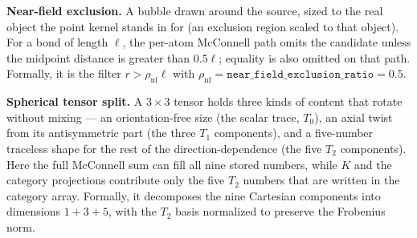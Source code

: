 \documentclass[11pt]{article}
\newcommand{\code}[1]{\texttt{#1}}
\begin{document}
\textbf{Near-field exclusion.} A bubble drawn around the source, sized to the
real object the point kernel stands in for (an exclusion region scaled to that
object). For a
bond of length \(\ell\), the per-atom McConnell path omits the candidate unless
the midpoint distance is greater than \(0.5\ell\); equality is also omitted on
that path. Formally, it is the filter \(r>\rho_{\mathrm{nf}}\ell\) with
\(\rho_{\mathrm{nf}}=\code{near\_field\_exclusion\_ratio}=0.5\).

\textbf{Spherical tensor split.} A \(3\times3\) tensor holds three kinds of
content that rotate without mixing --- an orientation-free size (the scalar
trace, \(T_0\)), an axial twist from its antisymmetric part (the three \(T_1\)
components), and a five-number traceless shape for the rest of the
direction-dependence (the five \(T_2\) components). Here the full McConnell sum
can fill all nine stored numbers, while \(K\) and the category projections
contribute only the five \(T_2\) numbers that are written in the category array.
Formally, it decomposes the nine Cartesian components into dimensions
\(1+3+5\), with the \(T_2\) basis normalized to preserve the Frobenius norm.
\end{document}
